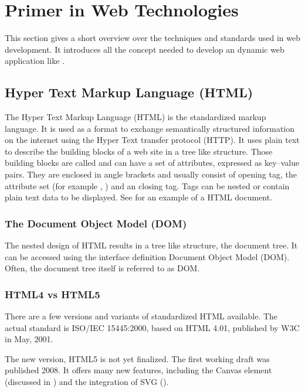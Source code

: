 \section{Primer in Web Technologies}
\label{sec:primer}

This section gives a short overview over the techniques and standards used in web development.
It introduces all the concept needed to develop an dynamic web application like \spl.



\subsection{Hyper Text Markup Language (HTML)}
The Hyper Text Markup Language (HTML) is the standardized markup language.
It is used as a format to exchange semantically structured information on the internet using the Hyper Text transfer protocol (HTTP).
It uses plain text to describe the building blocks of a web site in a tree like structure.
Those building blocks are called  and can have a set of attributes, expressed as key--value pairs.
They are enclosed in angle brackets and usually consist of opening tag, the attribute set (for example , ) and an closing tag.
Tags can be nested or contain plain text data to be displayed.
See  for an example of a HTML document.


\subsubsection{The Document Object Model (DOM)}
The nested design of HTML results in a tree like structure, the document tree.
It can be accessed using the interface definition Document Object Model (DOM).
Often, the document tree itself is referred to as DOM.


\subsubsection{HTML4 vs HTML5}

There are a few versions and variants of standardized HTML available.
The actual standard is ISO/IEC 15445:2000\cite{isohtml}, based on HTML 4.01, published by W3C in May, 2001.

The new version, HTML5 is not yet finalized.
The first working draft was published 2008\cite{html5_draft}.
It offers many new features, including the Canvas element (discussed in ) and the integration of SVG ().



